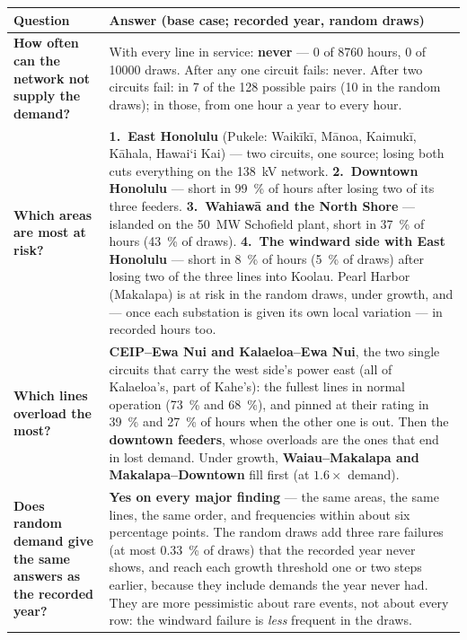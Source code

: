 \documentclass[11pt,a4paper]{article}
\newcommand{\okina}{\textquoteleft}
\begin{document}
\begin{center}
\small
\begin{tabular}{@{}p{}p{}@{}}
\toprule
\textbf{Question} & \textbf{Answer (base case; recorded year, random draws)} \\
\midrule
\textbf{How often can the network not supply the demand?} &
  With every line in service: \textbf{never} --- 0 of \num{8760} hours, 0 of
  \num{10000} draws. After any one circuit fails: never. After two circuits fail: in
  7 of the 128 possible pairs (10 in the random draws); in those, from one hour a year
  to every hour. \\[3pt]
\textbf{Which areas are most at risk?} &
  \textbf{1.~East Honolulu} (Pukele: Waik\=ik\=i, M\=anoa, Kaimuk\=i, K\=ahala,
  Hawai\okina i Kai) --- two circuits, one source; losing both cuts everything on the
  \SI{138}{kV} network. \textbf{2.~Downtown Honolulu} --- short in \SI{99}{\percent}
  of hours after losing two of its three feeders. \textbf{3.~Wahiaw\=a and the North
  Shore} --- islanded on the \SI{50}{MW} Schofield plant, short in \SI{37}{\percent}
  of hours (\SI{43}{\percent} of draws). \textbf{4.~The windward side with East
  Honolulu} --- short in \SI{8}{\percent} of hours (\SI{5}{\percent} of draws) after
  losing two of the three lines into Koolau. Pearl Harbor (Makalapa) is at risk in
  the random draws, under growth, and --- once each substation is given its own local
  variation --- in recorded hours too. \\[3pt]
\textbf{Which lines overload the most?} &
  \textbf{CEIP--Ewa Nui and Kalaeloa--Ewa Nui}, the two single circuits that carry the
  west side's power east (all of Kalaeloa's, part of Kahe's): the fullest lines in normal operation (\SI{73}{\percent}
  and \SI{68}{\percent}), and pinned at their rating in \SI{39}{\percent} and
  \SI{27}{\percent} of hours when the other one is out. Then the \textbf{downtown
  feeders}, whose overloads are the ones that end in lost demand. Under growth,
  \textbf{Waiau--Makalapa and Makalapa--Downtown} fill first (at $1.6\times$ demand). \\[3pt]
\textbf{Does random demand give the same answers as the recorded year?} &
  \textbf{Yes on every major finding} --- the same areas, the same lines, the same
  order, and frequencies within about six percentage points. The random draws add three
  rare failures (at most \SI{0.33}{\percent} of draws) that the recorded year never
  shows, and reach each growth threshold one or two steps earlier, because they include
  demands the year never had. They are more pessimistic about rare events, not about
  every row: the windward failure is \emph{less} frequent in the draws. \\
\bottomrule
\end{tabular}
\end{center}
\end{document}
